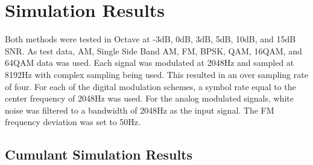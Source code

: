 \section*{Simulation Results}

Both methods were tested in Octave at -3dB, 0dB, 3dB, 5dB, 10dB, and 15dB SNR. 
As test data, AM, Single Side Band AM, FM, BPSK, QAM, 16QAM, and 64QAM data was
used.  Each signal was modulated at 2048Hz and sampled at 8192Hz with complex
sampling being used.  This resulted in an over sampling rate of four.  For each
of the digital modulation schemes, a symbol rate equal to the center frequency
of 2048Hz was used.  For the analog modulated signals, white noise was filtered
to a bandwidth of 2048Hz as the input signal.  The FM frequency deviation was
set to 50Hz.

\subsection*{Cumulant Simulation Results}


